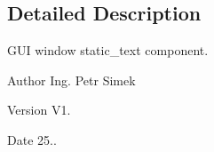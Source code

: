 \subsection{Detailed Description}
G\+UI window static\+\_\+text component. 

\begin{DoxyAuthor}{Author}
Ing. Petr Simek 
\end{DoxyAuthor}
\begin{DoxyVersion}{Version}
V1. 
\end{DoxyVersion}
\begin{DoxyDate}{Date}
25.. 
\end{DoxyDate}
